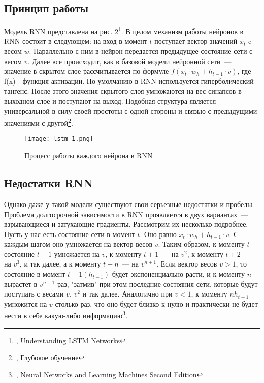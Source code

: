 \documentclass[12pt, a4paper]{article}
\begin{document}
\subsection{Принцип работы}

Модель RNN представлена на рис. 2\footnote{\cite{Colah}, Understanding LSTM Networks}. В целом механизм работы нейронов в RNN состоит в следующем: на вход в момент $t$ поступает вектор значений $x_t$ c весом $w$. Параллельно с ним в нейрон передается предыдущее состояние сети с весом $v$. Далее все происходит, как в базовой модели нейронной сети~--- значение в скрытом слое рассчитывается по формуле $f(x_t \cdot w_h + h_{t-1} \cdot v)$, где f(x) - функция активации. По умолчанию в RNN используется гиперболический тангенс.
После этого значения скрытого слоя умножаются на вес синапсов в выходном слое и поступают на выход. Подобная структура является универсальной в силу своей простоты с одной стороны и связью с предыдущими значениями с другой\footnote{\cite{DeepLearning}, Глубокое обучение}.

\begin{figure}[h]
    \centering
    \texttt{[image: lstm\_1.png]}
		\caption{Процесс работы каждого нейрона в RNN}
\end{figure}

\subsection{Недостатки RNN}

Однако даже у такой модели существуют свои серьезные недостатки и пробелы. Проблема долгосрочной зависимости в RNN проявляется в двух вариантах~--- взрывающиеся и затухающие градиенты. Рассмотрим их несколько подробнее.
Пусть у нас есть состояние сети в момент $t$. Оно равно  $x_t \cdot w_h + h_{t-1} \cdot v$. С каждым шагом оно умножается на вектор весов $v$. Таким образом, к моменту $t$ состояние $t - 1$ умножается на $v$, к моменту $t + 1$~--- на $v^2$, к моменту $t + 2$~--- на $v^3$, и так далее, а к моменту $t + n$~--- на $v^{n+1}$.
Если вектор весов $v > 1$, то состояние в момент $t - 1 (h_{t-1})$ будет экспоненциально расти, и к моменту $n$ вырастет в $v^{n + 1}$ раз, "затмив" при этом последние состояния сети, которые будут поступать с весами $v$, $v^2$ и так далее.
Аналогично при $v < 1$, к моменту $n h_{t-1}$ умножится на $v$ столько раз, что оно будет близко к нулю и практически не будет нести в себе какую-либо информацию\footnote{\cite{Khaykin}, Neural Networks and Learning Machines Second Edition}.
\end{document}
